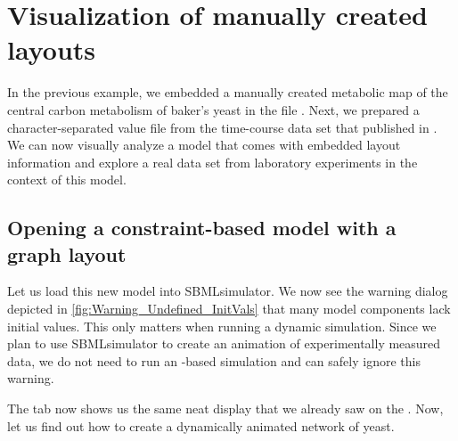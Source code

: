 
\chapter{Visualization of manually created layouts}
\label{chap:VisLayout}

In the previous example, we embedded a manually created metabolic map of the central carbon metabolism of baker's yeast in the \SBML file \iMM \citep{Mo2009}.
Next, we prepared a character-separated value file from the time-course data set that \citeauthor{Bergdahl2012} published in \citeyear{Bergdahl2012}.
We can now visually analyze a model that comes with embedded layout information and explore a real data set from laboratory experiments in the context of this model.

\section{Opening a constraint-based model with a graph layout}

Let us load this new model into SBMLsimulator.
We now see the warning dialog depicted in \cref{fig:Warning_Undefined_InitVals} that many model components lack initial values.
This only matters when running a dynamic simulation.
Since we plan to use SBMLsimulator to create an animation of experimentally measured data, we do not need to run an \ODE-based simulation and can safely ignore this warning.
\begin{SCfigure}
  \caption[Warning when loading a model with undefined initial values]{Warning when loading a model with undefined initial values.
  Constraint-based models, such as \iMM can be simulated in a flux-balance framework that does not require initial amounts to be known for reactive species.
  This warning indicate that the model cannot directly simulated in an \ODE framework.
  SBMLsimulator automatically assigns the value 1 where missing.
  It is also possible to estimate missing values using \EvA.}
  \label{fig:Warning_Undefined_InitVals}
\end{SCfigure}

The  tab now shows us the same neat display that we already saw on the \BiGG \citep{King2015b, Norsigian2019}.
Now, let us find out how to create a dynamically animated network of yeast.

